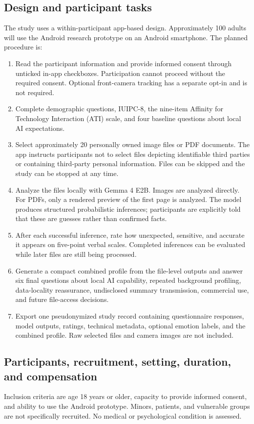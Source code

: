 \documentclass[10pt,a4paper]{article}
\begin{document}
\subsection*{Design and participant tasks}
The study uses a within-participant app-based design. Approximately 100 adults will use the Android research prototype on an Android smartphone. The planned procedure is:
\begin{enumerate}
  \item Read the participant information and provide informed consent through unticked in-app checkboxes. Participation cannot proceed without the required consent. Optional front-camera tracking has a separate opt-in and is not required.
  \item Complete demographic questions, IUIPC-8, the nine-item Affinity for Technology Interaction (ATI) scale, and four baseline questions about local AI expectations.
  \item Select approximately 20 personally owned image files or PDF documents. The app instructs participants not to select files depicting identifiable third parties or containing third-party personal information. Files can be skipped and the study can be stopped at any time.
  \item Analyze the files locally with Gemma 4 E2B. Images are analyzed directly. For PDFs, only a rendered preview of the first page is analyzed. The model produces structured probabilistic inferences; participants are explicitly told that these are guesses rather than confirmed facts.
  \item After each successful inference, rate how unexpected, sensitive, and accurate it appears on five-point verbal scales. Completed inferences can be evaluated while later files are still being processed.
  \item Generate a compact combined profile from the file-level outputs and answer six final questions about local AI capability, repeated background profiling, data-locality reassurance, undisclosed summary transmission, commercial use, and future file-access decisions.
  \item Export one pseudonymized study record containing questionnaire responses, model outputs, ratings, technical metadata, optional emotion labels, and the combined profile. Raw selected files and camera images are not included.
\end{enumerate}

\subsection*{Participants, recruitment, setting, duration, and compensation}
Inclusion criteria are age 18 years or older, capacity to provide informed consent, and ability to use the Android prototype. Minors, patients, and vulnerable groups are not specifically recruited. No medical or psychological condition is assessed.
\end{document}
